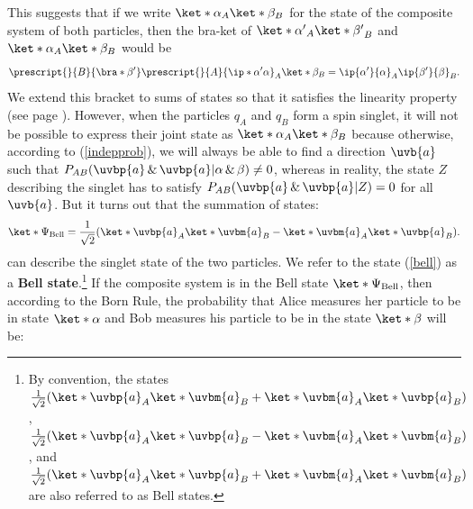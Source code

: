 \documentclass[12pt]{report}
\providecommand{\DIFadd}[1]{{\protect\color{blue}\uwave{#1}}} %
\providecommand{\DIFdel}[1]{{\protect\color{red}\sout{#1}}}                      %
\providecommand{\DIFaddbegin}{} %
\providecommand{\DIFaddend}{} %
\providecommand{\DIFdelbegin}{} %
\providecommand{\DIFdelend}{} %
\begin{document}
This suggests that if we write $\ket*{\alpha}_A\ket*{\beta}_B$ %
%
for the state of the composite system of both particles, then the bra-ket of $\ket*{\alpha'}_A\ket*{\beta'}_B$ and $\ket*{\alpha}_A\ket*{\beta}_B$ 
would be
\begin{equation}\label{innerprod}
    \prescript{}{B}{ \bra*{\beta'}}\prescript{}{A}{\ip*{\alpha'}{\alpha}}_A\ket*{\beta}_B=\ip{\alpha'}{\alpha}_A\ip{\beta'}{\beta}_B.
\end{equation} %
%
We extend this bracket to sums of states so that it satisfies the linearity property (see page \pageref{linearity}).
However, when the particles $q_A$ and $q_B$ form a spin singlet, it will not be possible to express their joint state as $\ket*{\alpha}_A\ket*{\beta}_B$ because otherwise, according to (\ref{indepprob}), we will always be able to find a direction $\uvb{a}$ such that \DIFdelbegin \DIFdel{$P_{AB}(\uvbp{a}\,\&\,\uvbp{a}|\alpha\,\&\,\beta)\neq 0$}\DIFdelend \DIFaddbegin \DIFadd{$P_{AB}(\uvbp{a}, \uvbp{a}|\alpha, \beta)\neq 0$}\DIFaddend , whereas in reality, the state $Z$ describing the singlet has to satisfy \DIFdelbegin \DIFdel{$P_{AB}(\uvbp{a}\,\&\,\uvbp{a}|Z)=0$ }\DIFdelend \DIFaddbegin \DIFadd{$P_{AB}(\uvbp{a}, \uvbp{a}|Z)=0$ }\DIFaddend for all  $\uvb{a}$.
But it turns out that the summation of states:
\begin{equation}\label{bell}
    \ket*{\Psi_{\text{Bell}}}=\frac{1}{\sqrt{2}}(\ket*{\uvbp{a}}_A\ket*{\uvbm{a}}_B-\ket*{\uvbm{a}}_A\ket*{\uvbp{a}}_B).
\end{equation} %
%
can describe the singlet state of the two particles. We refer to the state (\ref{bell}) as a \textbf{Bell state}.\footnote{By convention, the states $ \frac{1}{\sqrt{2}}(\ket*{\uvbp{a}}_A\ket*{\uvbm{a}}_B+\ket*{\uvbm{a}}_A\ket*{\uvbp{a}}_B)$, $ \frac{1}{\sqrt{2}}(\ket*{\uvbp{a}}_A\ket*{\uvbp{a}}_B-\ket*{\uvbm{a}}_A\ket*{\uvbm{a}}_B)$, and $ \frac{1}{\sqrt{2}}(\ket*{\uvbp{a}}_A\ket*{\uvbp{a}}_B+\ket*{\uvbm{a}}_A\ket*{\uvbm{a}}_B)$ are also referred to as Bell states.} If the composite system is in the Bell state $\ket*{\Psi_{\text{Bell}}}$, then according to the Born Rule, the probability that Alice measures her particle to be in state $\ket*{\alpha}$ and Bob measures his particle to be in the state $\ket*{\beta}$ will be:
\end{document}
